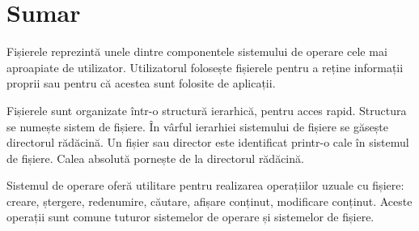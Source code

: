 \section{Sumar}
\label{sec:fs:summary}

Fișierele reprezintă unele dintre componentele sistemului de operare cele mai aproapiate de utilizator.
Utilizatorul folosește fișierele pentru a reține informații proprii sau pentru că acestea sunt folosite de aplicații.

Fișierele sunt organizate într-o structură ierarhică, pentru acces rapid.
Structura se numește sistem de fișiere.
În vârful ierarhiei sistemului de fișiere se găsește directorul rădăcină.
Un fișier sau director este identificat printr-o cale în sistemul de fișiere.
Calea absolută pornește de la directorul rădăcină.

Sistemul de operare oferă utilitare pentru realizarea operațiilor uzuale cu fișiere: creare, ștergere, redenumire, căutare, afișare conținut, modificare conținut.
Aceste operații sunt comune tuturor sistemelor de operare și sistemelor de fișiere.
